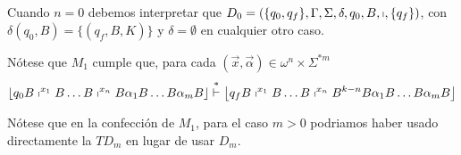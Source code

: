 \begin{frame}
  \begin{block}{}
    \PN Cuando $n=0$ debemos interpretar que $D_{0} = \left(\{q_{0},q_{f}\}, \Gamma, \Sigma, \delta, q_{0}, B,
    \shortmid, \{q_{f}\}\right)$, con $\delta(q_{0},B) = \{(q_{f},B,K)\}$ y $\delta = \emptyset$ en cualquier otro caso.

    \vspace{3mm}
    \PN Nótese que $M_{1}$ cumple que, para cada $(\vec{x},\vec{\alpha}) \in \omega^{n} \times \Sigma^{\ast m}$
    \normLetter
    \begin{equation*}
      \left\lfloor q_{0} B \shortmid^{x_{1}} B \dotsc B \shortmid^{x_{n}} B \alpha_{1} B \dotsc B \alpha_{m} B
      \right\rfloor \overset{\ast}{\vdash} \left\lfloor q_{f} B \shortmid^{x_{1}} B \dotsc B \shortmid^{x_{n}} B^{k-n}B
      \alpha_{1} B \dotsc B \alpha_{m} B \right\rfloor
    \end{equation*}

    \vspace{3mm}
    \sizeOfLetterThird
    \PN Nótese que en la confección de $M_{1}$, para el caso $m>0$ podriamos haber usado directamente la $TD_{m}$ en
    lugar de usar $D_{m}$.
  \end{block}
\end{frame}
